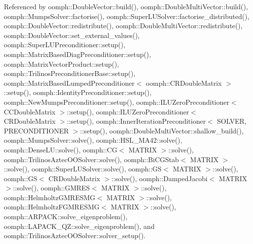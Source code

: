 Referenced by oomph\+::\+Double\+Vector\+::build(), oomph\+::\+Double\+Multi\+Vector\+::build(), oomph\+::\+Mumps\+Solver\+::factorise(), oomph\+::\+Super\+L\+U\+Solver\+::factorise\+\_\+distributed(), oomph\+::\+Double\+Vector\+::redistribute(), oomph\+::\+Double\+Multi\+Vector\+::redistribute(), oomph\+::\+Double\+Vector\+::set\+\_\+external\+\_\+values(), oomph\+::\+Super\+L\+U\+Preconditioner\+::setup(), oomph\+::\+Matrix\+Based\+Diag\+Preconditioner\+::setup(), oomph\+::\+Matrix\+Vector\+Product\+::setup(), oomph\+::\+Trilinos\+Preconditioner\+Base\+::setup(), oomph\+::\+Matrix\+Based\+Lumped\+Preconditioner$<$ oomph\+::\+C\+R\+Double\+Matrix $>$\+::setup(), oomph\+::\+Identity\+Preconditioner\+::setup(), oomph\+::\+New\+Mumps\+Preconditioner\+::setup(), oomph\+::\+I\+L\+U\+Zero\+Preconditioner$<$ C\+C\+Double\+Matrix $>$\+::setup(), oomph\+::\+I\+L\+U\+Zero\+Preconditioner$<$ C\+R\+Double\+Matrix $>$\+::setup(), oomph\+::\+Inner\+Iteration\+Preconditioner$<$ S\+O\+L\+V\+E\+R, P\+R\+E\+C\+O\+N\+D\+I\+T\+I\+O\+N\+E\+R $>$\+::setup(), oomph\+::\+Double\+Multi\+Vector\+::shallow\+\_\+build(), oomph\+::\+Mumps\+Solver\+::solve(), oomph\+::\+H\+S\+L\+\_\+\+M\+A42\+::solve(), oomph\+::\+Dense\+L\+U\+::solve(), oomph\+::\+C\+G$<$ M\+A\+T\+R\+I\+X $>$\+::solve(), oomph\+::\+Trilinos\+Aztec\+O\+O\+Solver\+::solve(), oomph\+::\+Bi\+C\+G\+Stab$<$ M\+A\+T\+R\+I\+X $>$\+::solve(), oomph\+::\+Super\+L\+U\+Solver\+::solve(), oomph\+::\+G\+S$<$ M\+A\+T\+R\+I\+X $>$\+::solve(), oomph\+::\+G\+S$<$ C\+R\+Double\+Matrix $>$\+::solve(), oomph\+::\+Damped\+Jacobi$<$ M\+A\+T\+R\+I\+X $>$\+::solve(), oomph\+::\+G\+M\+R\+E\+S$<$ M\+A\+T\+R\+I\+X $>$\+::solve(), oomph\+::\+Helmholtz\+G\+M\+R\+E\+S\+M\+G$<$ M\+A\+T\+R\+I\+X $>$\+::solve(), oomph\+::\+Helmholtz\+F\+G\+M\+R\+E\+S\+M\+G$<$ M\+A\+T\+R\+I\+X $>$\+::solve(), oomph\+::\+A\+R\+P\+A\+C\+K\+::solve\+\_\+eigenproblem(), oomph\+::\+L\+A\+P\+A\+C\+K\+\_\+\+Q\+Z\+::solve\+\_\+eigenproblem(), and oomph\+::\+Trilinos\+Aztec\+O\+O\+Solver\+::solver\+\_\+setup().

\mbox{\label{classoomph_1_1DistributableLinearAlgebraObject_adad20ac61a61d907f823da7694b50616}} 
